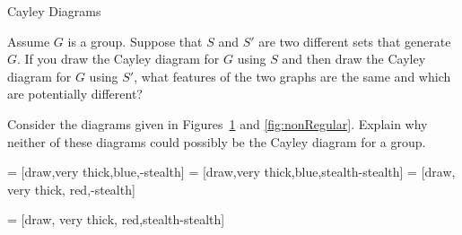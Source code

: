 \begin{section}{Cayley Diagrams}
\begin{problem}\label{prob:changing_generators_for_Cayley_diagram}
Assume $G$ is a group.  Suppose that $S$ and $S'$ are two different sets that generate $G$.  If you draw the Cayley diagram for $G$ using $S$ and then draw the Cayley diagram for $G$ using $S'$, what features of the two graphs are the same and which are potentially different?
\end{problem}

\begin{problem}
Consider the diagrams given in Figures~\ref{fig:nonCayley} and \ref{fig:nonRegular}. Explain why neither of these diagrams could possibly be the Cayley diagram for a group.
\end{problem}

 = [draw,very thick,blue,-stealth]
 = [draw,very thick,blue,stealth-stealth]
 = [draw, very thick, red,-stealth]

\begin{figure}[!ht]
\centering
{}
\caption{}
\label{fig:nonCayley}
\end{figure}

 = [draw, very thick, red,stealth-stealth]

\begin{figure}[!ht]
\centering
{}
\end{figure}
\end{section}
